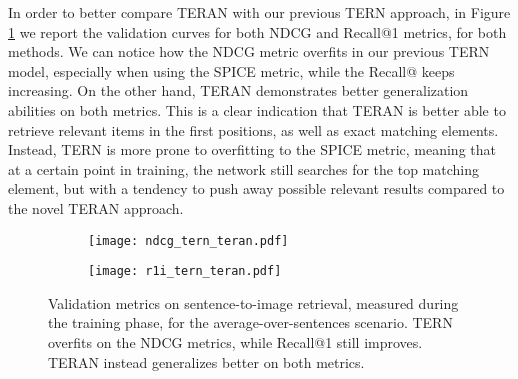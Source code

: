\documentclass[acmsmall]{acmart}
\newcommand{\majorrevised}[1]{#1}
\begin{document}
\majorrevised{In order to better compare TERAN with our previous TERN approach, in Figure \ref{fig:tern_overfit} we report the validation curves for both NDCG and Recall@1 metrics, for both methods. We can notice how the NDCG metric overfits in our previous TERN model, especially when using the SPICE metric, while the Recall@ keeps increasing. On the other hand, TERAN demonstrates better generalization abilities on both metrics. This is a clear indication that TERAN is better able to retrieve relevant items in the first positions, as well as exact matching elements. Instead, TERN is more prone to overfitting to the SPICE metric, meaning that at a certain point in training, the network still searches for the top matching element, but with a tendency to push away possible relevant results compared to the novel TERAN approach.}

\begin{figure}[t]
\begin{subfigure}[t]{0.49\textwidth}
\centering
\texttt{[image: ndcg\_tern\_teran.pdf]}
\end{subfigure}
\begin{subfigure}[t]{0.473\textwidth}
\centering
\texttt{[image: r1i\_tern\_teran.pdf]}
\end{subfigure}
\caption{\majorrevised{Validation metrics on sentence-to-image retrieval, measured during the training phase, for the average-over-sentences scenario. TERN overfits on the NDCG metrics, while Recall@1 still improves. TERAN instead generalizes better on both metrics.}}
\label{fig:tern_overfit}       \end{figure}
\end{document}
